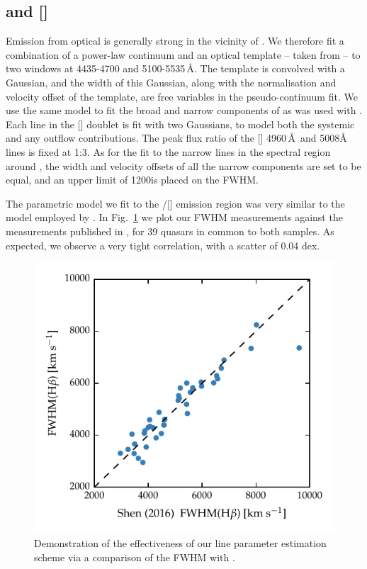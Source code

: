 \subsection{\hb and []}

Emission from optical  is generally strong in the vicinity of \hbns.
We therefore fit a combination of a power-law continuum and an optical  template -- taken from \citet{boroson92} -- to two windows at 4435-4700 and 5100-5535\,\AA. 
The  template is convolved with a Gaussian, and the width of this Gaussian, along with the normalisation and velocity offset of the  template, are free variables in the pseudo-continuum fit.
We use the same model to fit the broad and narrow components of \hb as was used with \hans. 
Each line in the [] doublet is fit with two Gaussians, to model both the systemic and any outflow contributions. 
The peak flux ratio of the [] 4960\,\AA\, and 5008\AA\, lines is fixed at 1:3. 
As for the fit to the narrow lines in the spectral region around \hans, the width and velocity offsets of all the narrow components are set to be equal, and an upper limit of 1200\kms is placed on the FWHM. 

The parametric model we fit to the \hbns/[] emission region was very similar to the model employed by \citet{shen16a}. 
In Fig.~\ref{fig:shen_comparison_hb} we plot our \hb FWHM measurements against the measurements published in \citet{shen16a}, for 39 quasars in common to both samples. 
As expected, we observe a very tight correlation, with a scatter of 0.04 dex. 

\begin{figure}
    \centering 
    \includegraphics[width=0.8\linewidth]{figures/chapter03/shen_comparison_hb.pdf} 
    \caption{Demonstration of the effectiveness of our line parameter estimation scheme via a comparison of the \hb FWHM with \citet{shen16a}.} 
    \label{fig:shen_comparison_hb}
\end{figure}

